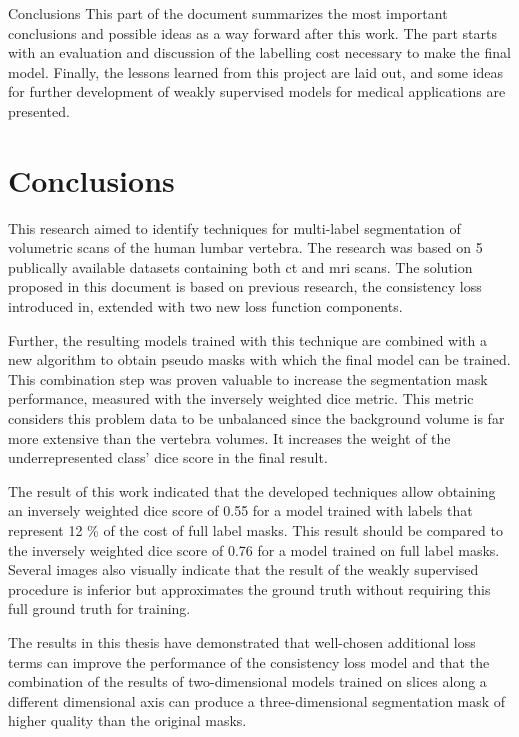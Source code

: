 \begin{partwithabstract}{Conclusions}
    This part of the document summarizes the most important conclusions and possible ideas as a way forward after this work.
    The part starts with an evaluation and discussion of the labelling cost necessary to make the final model. 
    Finally, the lessons learned from this project are laid out, and some ideas for further development of weakly supervised models for medical applications are presented. 
\end{partwithabstract}
\restoregeometry

\chapter{Conclusions}
\par{
    This research aimed to identify techniques for multi-label segmentation of volumetric scans of the human lumbar vertebra.
    The research was based on 5 publically available datasets containing both \acrshort{ct} and \acrshort{mri} scans.
    The solution proposed in this document is based on previous research, the consistency loss introduced in\cite{Laradji2021}, extended with two new loss function components.  
}
\par{
    Further, the resulting models trained with this technique are combined with a new algorithm to obtain pseudo masks with which the final model can be trained.
    This combination step was proven valuable to increase the segmentation mask performance, measured with the inversely weighted dice metric.
    This metric considers this problem data to be unbalanced since the background volume is far more extensive than the vertebra volumes. 
    It increases the weight of the underrepresented class' dice score in the final result.
}
\par{
    The result of this work indicated that the developed techniques allow obtaining an inversely weighted dice score of 0.55 for a model trained with labels that represent 12 \% of the cost of full label masks.
    This result should be compared to the inversely weighted dice score of 0.76 for a model trained on full label masks.
    Several images also visually indicate that the result of the weakly supervised procedure is inferior but approximates the ground truth without requiring this full ground truth for training.
}
\par{
    The results in this thesis have demonstrated that well-chosen additional loss terms can improve the performance of the consistency loss model and that the combination of the results of two-dimensional models trained on slices along a different dimensional axis can produce a three-dimensional segmentation mask of higher quality than the original masks.
}

